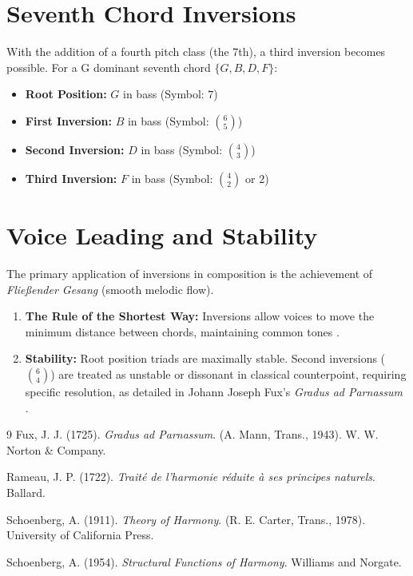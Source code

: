 \documentclass[11pt,a4paper]{article}
\begin{document}
\section{Seventh Chord Inversions}
With the addition of a fourth pitch class (the 7th), a third inversion becomes possible. For a G dominant seventh chord $\{G, B, D, F\}$:
\begin{itemize}
    \item \textbf{Root Position:} $G$ in bass (Symbol: $7$)
    \item \textbf{First Inversion:} $B$ in bass (Symbol: $\binom{6}{5}$)
    \item \textbf{Second Inversion:} $D$ in bass (Symbol: $\binom{4}{3}$)
    \item \textbf{Third Inversion:} $F$ in bass (Symbol: $\binom{4}{2}$ or $2$)
\end{itemize}

\section{Voice Leading and Stability}
The primary application of inversions in composition is the achievement of \textit{Fließender Gesang} (smooth melodic flow).

\begin{enumerate}
    \item \textbf{The Rule of the Shortest Way:} Inversions allow voices to move the minimum distance between chords, maintaining common tones \citep{schoenberg1911}.
    \item \textbf{Stability:} Root position triads are maximally stable. Second inversions ($\binom{6}{4}$) are treated as unstable or dissonant in classical counterpoint, requiring specific resolution, as detailed in Johann Joseph Fux's \textit{Gradus ad Parnassum} \citep{fux1725}.
\end{enumerate}

\begin{thebibliography}{9}
Fux, J. J. (1725). \textit{Gradus ad Parnassum}. (A. Mann, Trans., 1943). W. W. Norton \& Company.

Rameau, J. P. (1722). \textit{Traité de l'harmonie réduite à ses principes naturels}. Ballard.

Schoenberg, A. (1911). \textit{Theory of Harmony}. (R. E. Carter, Trans., 1978). University of California Press.

Schoenberg, A. (1954). \textit{Structural Functions of Harmony}. Williams and Norgate.
\end{thebibliography}
\end{document}
